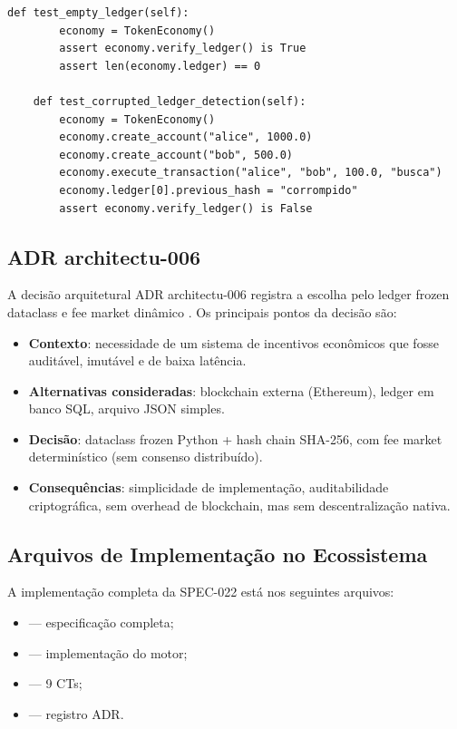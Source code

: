 \begin{lstlisting}[caption={Testes TDD da SPEC-022},label={lst:spec022-tests}]
    def test_empty_ledger(self):
        economy = TokenEconomy()
        assert economy.verify_ledger() is True
        assert len(economy.ledger) == 0

    def test_corrupted_ledger_detection(self):
        economy = TokenEconomy()
        economy.create_account("alice", 1000.0)
        economy.create_account("bob", 500.0)
        economy.execute_transaction("alice", "bob", 100.0, "busca")
        economy.ledger[0].previous_hash = "corrompido"
        assert economy.verify_ledger() is False
\end{lstlisting}

\subsection{ADR architectu-006}

A decisão arquitetural ADR architectu-006 registra a escolha pelo
ledger frozen dataclass e fee market dinâmico
\cite{opencode2026token}. Os principais pontos da decisão são:

\begin{itemize}
\item \textbf{Contexto}: necessidade de um sistema de incentivos
econômicos que fosse auditável, imutável e de baixa latência.
\item \textbf{Alternativas consideradas}: blockchain externa
(Ethereum), ledger em banco SQL, arquivo JSON simples.
\item \textbf{Decisão}: dataclass frozen Python + hash chain SHA-256,
com fee market determinístico (sem consenso distribuído).
\item \textbf{Consequências}: simplicidade de implementação,
auditabilidade criptográfica, sem overhead de blockchain, mas sem
descentralização nativa.
\end{itemize}

\subsection{Arquivos de Implementação no Ecossistema}

A implementação completa da SPEC-022 está nos seguintes arquivos:

\begin{itemize}
\item {} —
especificação completa;
\item {} —
implementação do motor;
\item {} — 9 CTs;
\item {} — registro ADR.
\end{itemize}

